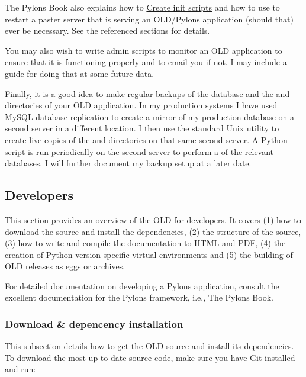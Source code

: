 \documentclass[letterpaper,10pt,english]{sphinxmanual}
\begin{document}
The Pylons Book also explains how to
\href{http://pylonsbook.com/en/1.1/deployment.html\#creating-init-scripts}{Create init scripts}
and how to use  to restart a paster server that is serving an
OLD/Pylons application (should that) ever be necessary.  See the referenced
sections for details.

You may also wish to write admin scripts to monitor an OLD application to ensure
that it is functioning properly and to email you if not.  I may include a guide
for doing that at some future data.

Finally, it is a good idea to make regular backups of the database and the
 and  directories of your OLD application.  In my
production systems I have used
\href{http://www.howtoforge.com/mysql\_database\_replication}{MySQL database replication}
to create a mirror of my production database on a second server in a different
location.  I then use the standard Unix utility  to create live copies
of the  and  directories on that same second server.
A Python script is run periodically on the second server to perform a 
of the relevant databases.  I will further document my backup setup at a later
date.


\subsection{Developers}
\label{installation:id4}\label{installation:developers}
This section provides an overview of the OLD for developers.  It covers (1) how
to download the source and install the dependencies, (2) the structure of the
source, (3) how to write and compile the documentation to HTML and PDF, (4) the
creation of Python version-specific virtual environments and (5) the building of
OLD releases as eggs or archives.

For detailed documentation on developing a Pylons application, consult the
excellent documentation for the Pylons framework, i.e., The Pylons Book.


\subsubsection{Download \& depencency installation}
\label{installation:download-depencency-installation}
This subsection details how to get the OLD source and install its dependencies.
To download the most up-to-date source code, make sure you have
\href{http://git-scm.com/}{Git} installed and run:
\end{document}
